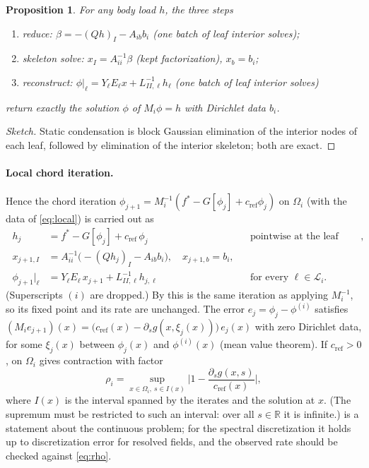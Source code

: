 \documentclass[11pt,a4paper]{article}
\newtheorem{proposition}{Proposition}
\theoremstyle{remark}\newtheorem{remark}{Remark}
\newcommand{\R}{\mathbb{R}}
\newcommand{\cR}{c_{\mathrm{ref}}}
\begin{document}
\begin{proposition}\label{prop:condense}
For any body load $h$, the three steps
\begin{enumerate}
  \item \emph{reduce:} $\beta=-(Qh)_I-A_{ib}b_i$ (one batch of leaf interior solves);
  \item \emph{skeleton solve:} $x_I=A_{ii}^{-1}\beta$ (kept factorization), $x_b=b_i$;
  \item \emph{reconstruct:} $\phi|_\ell=Y_\ell E_\ell x+L_{II,\ell}^{-1}h_\ell$ (one batch of leaf interior solves)
\end{enumerate}
return exactly the solution $\phi$ of $M_i\phi=h$ with Dirichlet data $b_i$.
\end{proposition}
\begin{proof}[Sketch]
Static condensation is block Gaussian elimination of the interior nodes of each
leaf, followed by elimination of the interior skeleton; both are exact.
\end{proof}

\paragraph{Local chord iteration.} Hence the chord iteration
$\phi_{j+1}=M_i^{-1}(f^*-G[\phi_j]+\cR\phi_j)$ on $\Omega_i$ (with the data of
\eqref{eq:local}) is carried out as
\begin{equation}\label{eq:lchord}
\boxed{\;
\begin{aligned}
  h_j&=f^*-G[\phi_j]+\cR\,\phi_j &&\text{pointwise at the leaf interior nodes},\\
  x_{j+1,I}&=A_{ii}^{-1}\big(-(Qh_j)_I-A_{ib}b_i\big),\quad x_{j+1,b}=b_i,\\
  \phi_{j+1}|_\ell&=Y_\ell E_\ell\,x_{j+1}+L_{II,\ell}^{-1}h_{j,\ell}
  &&\text{for every }\ell\in\mathcal L_i .
\end{aligned}\;}
\end{equation}
(Superscripts $(i)$ are dropped.) By  this is the same
iteration as applying $M_i^{-1}$, so its fixed point and its rate are
unchanged. The error $e_j=\phi_j-\phi^{(i)}$ satisfies
$(M_ie_{j+1})(x)=\big(\cR(x)-\partial_sg(x,\xi_j(x))\big)\,e_j(x)$ with zero
Dirichlet data, for some $\xi_j(x)$ between $\phi_j(x)$ and $\phi^{(i)}(x)$
(mean value theorem). If $\cR>0$,  on $\Omega_i$ gives
contraction with factor
\begin{equation}\label{eq:rho}
  \rho_i=\sup_{x\in\Omega_i,\ s\in I(x)}\Big|1-\frac{\partial_sg(x,s)}{\cR(x)}\Big|,
\end{equation}
where $I(x)$ is the interval spanned by the iterates and the solution at $x$.
(The supremum must be restricted to such an interval: over all $s\in\R$ it is
infinite.)  is a statement about the continuous problem; for
the spectral discretization it holds up to discretization error for resolved
fields, and the observed rate should be checked against \eqref{eq:rho}.
\end{document}
